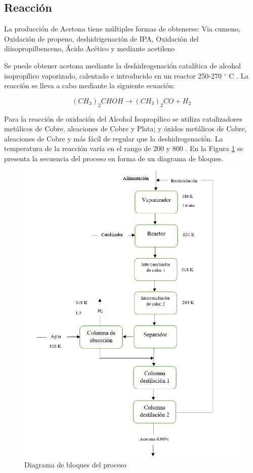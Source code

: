 \begin{multicols}{2}

    \subsection*{Reacción}

    La producción de Acetona tiene múltiples formas de obtenerse: Via cumeno, Oxidación de propeno,  deshidrigenación de IPA, Oxidación del diisopropilbenceno, Ácido Acético  y mediante acetileno

    Se puede obtener acetona mediante la deshidrogenación catalítica de alcohol isopropílico vaporizado, calentado e introducido en un reactor 250-270 $^{\circ} $ C \cite{acevedotrabajo}.
    La reacción se lleva a cabo mediante la siguiente ecuación:

            $$ (CH_3)_{2}CHOH  \rightarrow (CH_3)_2CO + H_2 $$

    Para la reacción de oxidación del Alcohol Isopropìlico se utiliza catalizadores metálicos de Cobre, aleaciones de Cobre y Plata; y óxidos metálicos de Cobre, aleaciones de Cobre y más fácil de regular que la deshidrogenación. La temperatura de la reacción varía en el rango de 200 y 800 \cite{quiroz2014diseno}.
    En la Figura \ref{fig:my_label} se presenta la secuencia del proceso en forma de un diagrama de bloques.

        \begin{figure}[H]
            \centering
            \includegraphics[scale=0.7]{images/Diagrama_completo.pdf}
            \caption{Diagrama de bloques del proceso}
            \label{fig:my_label}
        \end{figure}



\end{multicols}
